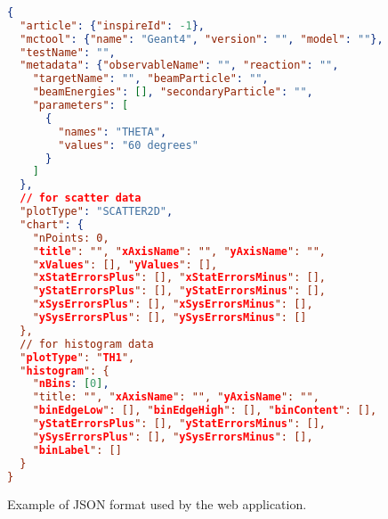 \setcounter{figure}{0}
\renewcommand{\figurename}{Appendix}



\begin{figure}

\begin{lstlisting}[language=json,firstnumber=1]
  
{
  "article": {"inspireId": -1},
  "mctool": {"name": "Geant4", "version": "", "model": ""},
  "testName": "",
  "metadata": {"observableName": "", "reaction": "",
    "targetName": "", "beamParticle": "",
    "beamEnergies": [], "secondaryParticle": "",
    "parameters": [
      {
        "names": "THETA",
        "values": "60 degrees"
      }
    ]
  },
  // for scatter data
  "plotType": "SCATTER2D",
  "chart": {
    "nPoints: 0,
    "title": "", "xAxisName": "", "yAxisName": "",
    "xValues": [], "yValues": [],
    "xStatErrorsPlus": [], "xStatErrorsMinus": [],
    "yStatErrorsPlus": [], "yStatErrorsMinus": [],
    "xSysErrorsPlus": [], "xSysErrorsMinus": [],
    "ySysErrorsPlus": [], "ySysErrorsMinus": []
  },
  // for histogram data
  "plotType": "TH1",
  "histogram": {
    "nBins: [0],
    "title: "", "xAxisName": "", "yAxisName": "",
    "binEdgeLow": [], "binEdgeHigh": [], "binContent": [],
    "yStatErrorsPlus": [], "yStatErrorsMinus": [],
    "ySysErrorsPlus": [], "ySysErrorsMinus": [],
    "binLabel": []
  }
}
\end{lstlisting}

\caption{Example of JSON format used by the web application.}
\label{adx:JSON-format}
\end{figure}




%
